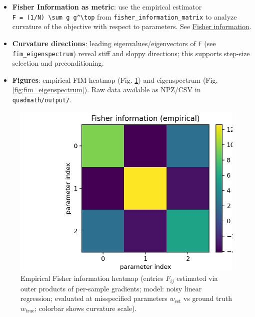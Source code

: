 \documentclass[
]{article}
\providecommand{\tightlist}{%
  \setlength{\itemsep}{0pt}\setlength{\parskip}{0pt}}
\begin{document}
\begin{itemize}
\tightlist
\item
  \textbf{Fisher Information as metric}: use the empirical estimator
  \texttt{F\ =\ (1/N)\ \textbackslash{}sum\ g\ g\^{}\textbackslash{}top}
  from \texttt{fisher\_information\_matrix} to analyze curvature of the
  objective with respect to parameters. See
  \href{https://en.wikipedia.org/wiki/Fisher_information}{Fisher
  information}.
\item
  \textbf{Curvature directions}: leading eigenvalues/eigenvectors of
  \texttt{F} (see \texttt{fim\_eigenspectrum}) reveal stiff and sloppy
  directions; this supports step-size selection and preconditioning.
\item
  \textbf{Figures}: empirical FIM heatmap (Fig.
  \ref{fig:fisher_information_matrix}) and eigenspectrum (Fig.
  \ref{fig:fim_eigenspectrum}). Raw data available as NPZ/CSV in
  \texttt{quadmath/output/}.
\end{itemize}

\begin{figure}
\hypertarget{fig:fisher_information_matrix}{%
\centering
\includegraphics{../output/figures/fisher_information_matrix.png}
\caption{Empirical Fisher information heatmap (entries \(F_{ij}\)
estimated via outer products of per-sample gradients; model: noisy
linear regression; evaluated at misspecified parameters \(w_\text{est}\)
vs ground truth \(w_\text{true}\); colorbar shows curvature
scale).}\label{fig:fisher_information_matrix}
}
\end{figure}
\end{document}

